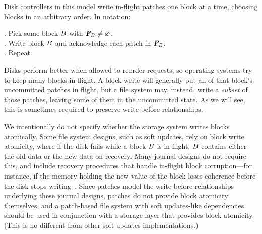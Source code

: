 
Disk controllers in this model write in-flight patches one block at a time,
 choosing blocks in an arbitrary order. In notation:
%
\begin{tabbing}
\qquad {}. Pick some block $B$ with $\PInf[\PB] \neq \emptyset$. \\
\qquad {}. Write block $B$ and acknowledge each patch in $\PInf[\PB]$. \\
\qquad {}. Repeat.
\end{tabbing}
%
\noindent
%
Disks perform better when allowed to reorder requests, so operating systems
 try to keep many blocks in flight.
%
%
A block write will generally put all of that block's uncommitted
 patches in flight, but a file system may, instead, write a \emph{subset} of those
 patches, leaving some of them in the uncommitted state.
%
As we will see, this is sometimes
 required to preserve write-before relationships.


We intentionally do not specify whether the storage system writes blocks
 atomically.
%
Some file system designs, such as soft updates, rely on block write
 atomicity, where
%
if the disk fails while a block $B$ is
 in flight, $B$ contains either the old data or the new data on recovery.
%
Many journal designs do not require this, and include recovery procedures
 that handle in-flight block corruption---for instance, if the memory
 holding the new value of the block loses coherence before the disk stops
 writing~\cite{tso04ext3}.
%
Since patches model the write-before relationships underlying these
 journal designs, patches do not provide block atomicity themselves, and
%
a patch-based file system with soft updates-like dependencies
 should be used in conjunction with a storage layer that provides block
 atomicity.  (This is no different from other soft updates
 implementations.)


